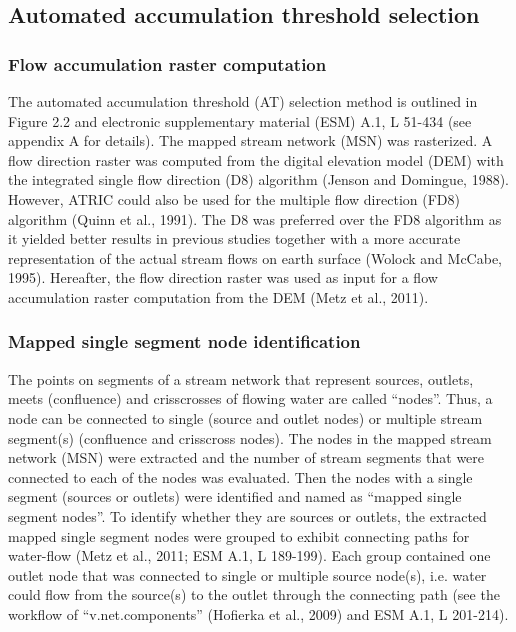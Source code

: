 \subsection{Automated accumulation threshold selection}
\label{Automated accumulation threshold selection}

\subsubsection{Flow accumulation raster computation}
\label{Flow accumulation raster computation}

The automated accumulation threshold (AT) selection method is outlined in Figure 2.2 and electronic supplementary material (ESM) A.1, L 51-434 (see appendix A for details). The mapped stream network (MSN) was rasterized. A flow direction raster was computed from the digital elevation model (DEM) with the integrated single flow direction (D8) algorithm (Jenson and Domingue, 1988). However, ATRIC could also be used for the multiple flow direction (FD8) algorithm (Quinn et al., 1991). The D8 was preferred over the FD8 algorithm as it yielded better results in previous studies together with a more accurate representation of the actual stream flows on earth surface (Wolock and McCabe, 1995). Hereafter, the flow direction raster was used as input for a flow accumulation raster computation from the DEM (Metz et al., 2011).

\subsubsection{Mapped single segment node identification}
\label{Mapped single segment node identification}

The points on segments of a stream network that represent sources, outlets, meets (confluence) and crisscrosses of flowing water are called “nodes”. Thus, a node can be connected to single (source and outlet nodes) or multiple stream segment(s) (confluence and crisscross nodes). The nodes in the mapped stream network (MSN) were extracted and the number of stream segments that were connected to each of the nodes was evaluated. Then the nodes with a single segment (sources or outlets) were identified and named as “mapped single segment nodes”. To identify whether they are sources or outlets, the extracted mapped single segment nodes were grouped to exhibit connecting paths for water-flow (Metz et al., 2011; ESM A.1, L 189-199). Each group contained one outlet node that was connected to single or multiple source node(s), i.e. water could flow from the source(s) to the outlet through the connecting path (see the workflow of “v.net.components” (Hofierka et al., 2009) and ESM A.1, L 201-214).

